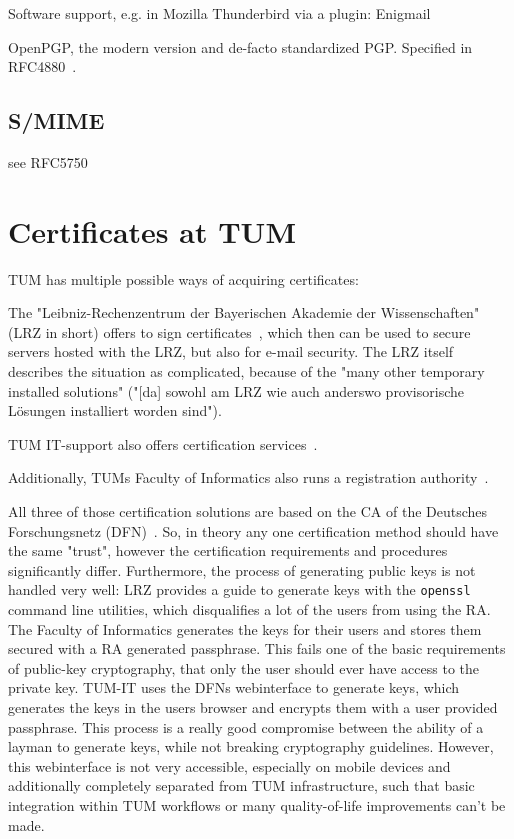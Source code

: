 Software support, e.g. in Mozilla Thunderbird via a plugin: Enigmail

OpenPGP, the modern version and de-facto standardized PGP.
Specified in RFC4880~\cite{RFC4880}.

\subsection{S/MIME}\label{subsec:s/mime}
see RFC5750~\cite{RFC5750}


\section{Certificates at TUM}\label{sec:certificatesAtTum}

TUM has multiple possible ways of acquiring certificates:

The "Leibniz-Rechenzentrum der Bayerischen Akademie der Wissenschaften" (LRZ in short) offers to sign
certificates~\cite{lrzpki}, which then can be used to secure servers hosted with the LRZ, but also for e-mail security.
The LRZ itself describes the situation as complicated, because of the "many other temporary installed solutions"
("[da] sowohl am LRZ wie auch anderswo provisorische L\"osungen installiert worden sind").

TUM IT-support also offers certification services~\cite{tumZertifikat}.

Additionally, TUMs Faculty of Informatics also runs a registration authority~\cite{inTumCertificates}.

All three of those certification solutions are based on the CA of the Deutsches Forschungsnetz (DFN)~\cite{dfnPki}.
So, in theory any one certification method should have the same "trust", however the certification requirements and
procedures significantly differ.
Furthermore, the process of generating public keys is not handled very well: LRZ provides a guide to generate keys with
the \lstinline{openssl} command line utilities, which disqualifies a lot of the users from using the RA\@.
The Faculty of Informatics generates the keys for their users and stores them secured with a RA generated passphrase.
This fails one of the basic requirements of public-key cryptography, that only the user should ever have access to the
private key.
TUM-IT uses the DFNs webinterface to generate keys, which generates the keys in the users browser and encrypts them with
a user provided passphrase.
This process is a really good compromise between the ability of a layman to generate keys, while not breaking
cryptography guidelines.
However, this webinterface is not very accessible, especially on mobile devices and additionally completely separated
from TUM infrastructure, such that basic integration within TUM workflows or many quality-of-life improvements can't be
made.

